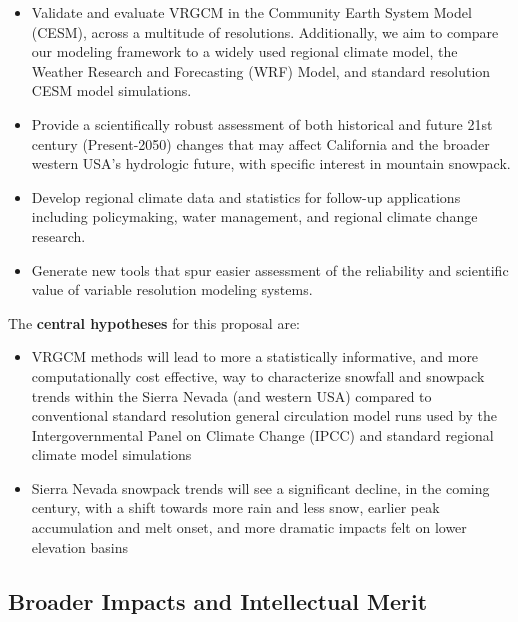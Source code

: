 \documentclass[11pt]{article}
\begin{document}
\begin{itemize}
  \item Validate and evaluate VRGCM in the Community Earth System Model (CESM), across a multitude of resolutions.  Additionally, we aim to compare our modeling framework to a widely used regional climate model, the Weather Research and Forecasting (WRF) Model, and standard resolution CESM model simulations.
  \item Provide a scientifically robust assessment of both historical and future 21st century (Present-2050) changes that may affect California and the broader western USA's hydrologic future, with specific interest in mountain snowpack. 
  \item Develop regional climate data and statistics for follow-up applications including policymaking, water management, and regional climate change research.
  \item Generate new tools that spur easier assessment of the reliability and scientific value of variable resolution modeling systems. 
\end{itemize}
The \textbf{central hypotheses} for this proposal are:
\begin{itemize}
  \item VRGCM methods will lead to more a statistically informative, and more computationally cost effective, way to characterize snowfall and snowpack trends within the Sierra Nevada (and western USA) compared to conventional standard resolution general circulation model runs used by the Intergovernmental Panel on Climate Change (IPCC) and standard regional climate model simulations
  \item Sierra Nevada snowpack trends will see a significant decline, in the coming century, with a shift towards more rain and less snow, earlier peak accumulation and melt onset, and more dramatic impacts felt on lower elevation basins
\end{itemize}

\subsection{Broader Impacts and Intellectual Merit}
\end{document}
